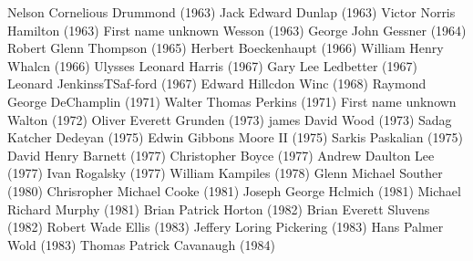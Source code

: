 \documentclass{memoir}
\begin{document}
\begin{refsegment}
\begin{multicols}{2}
Nelson Cornelious Drummond (1963)\newline
Jack Edward Dunlap (1963)\newline
Victor Norris Hamilton (1963)\newline
First name unknown Wesson (1963)\newline
George John Gessner (1964)\newline
Robert Glenn Thompson (1965)\newline
Herbert Boeckenhaupt (1966)\newline
William Henry Whalcn (1966)\newline
Ulysses Leonard Harris (1967)\newline
Gary Lee Ledbetter (1967)\newline
Leonard JenkinssTSaf-ford (1967)\newline
Edward Hillcdon Winc (1968)\newline
Raymond George DeChamplin (1971)\newline
Walter Thomas Perkins (1971)\newline
First name unknown Walton (1972)\newline
Oliver Everett Grunden (1973)\newline
james David Wood (1973)\newline
Sadag Katcher Dedeyan (1975)\newline
Edwin Gibbons Moore II (1975)\newline
Sarkis Paskalian (1975)\newline
David Henry Barnett (1977)\newline
Christopher Boyce (1977)\newline
Andrew Daulton Lee (1977)\newline
Ivan Rogalsky (1977)\newline
William Kampiles (1978)\newline
Glenn Michael Souther (1980)\newline
Chrisropher Michael Cooke (1981)\newline
Joseph George Hclmich (1981)\newline
Michael Richard Murphy (1981)\newline
Brian Patrick Horton (1982)\newline
Brian Everett Sluvens (1982)\newline
Robert Wade Ellis (1983)\newline
Jeffery Loring Pickering (1983)\newline
Hans Palmer Wold (1983)\newline
Thomas Patrick Cavanaugh (1984)\newline

\end{multicols}
\end{refsegment}
\end{document}
